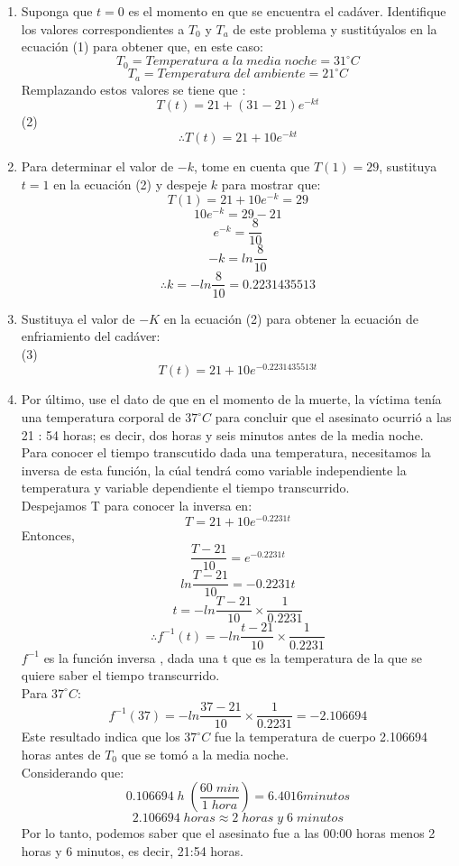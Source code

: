 \documentclass[12pt]{article}
\begin{document}
\begin{enumerate}
\item Suponga que $t = 0$ es el momento en que se encuentra el cadáver. Identifique los valores
correspondientes a $T_0$ y $T_a$ de este problema y sustitúyalos en la ecuación (1) para obtener
que, en este caso:
\[
T_0 = Temperatura \;a \;la\; media \;noche= 31  ^{\circ} C
\]
\[
T_a = Temperatura \;del \;ambiente = 21 ^{\circ}  C
\]
Remplazando estos valores se tiene que : 
\[
T(t)= 21 + (31-21)e^{-kt}
\]
(2)
\[
\therefore  T(t)= 21 + 10e^{-kt}
\]  
\item Para determinar el valor de $-k$, tome en cuenta que $T(1) = 29$, sustituya $t = 1$ en la ecuación (2) y despeje $k$ para mostrar que:
\[
 T(1)= 21 + 10e^{-k} = 29
\]  
\[
 10e^{-k} = 29-21
\]  
\[
  e^{-k} = \frac{8}{10}
\]  
\[
 -k = ln\frac{8}{10}
\]  
\[
 \therefore  k = -ln\frac{8}{10} = 0.2231435513
\] 
\item Sustituya el valor de $-K$ en la ecuación (2) para obtener la ecuación de enfriamiento del
cadáver:\\
(3)
\[
T(t)= 21 + 10e^{-0.2231435513t}
\] 
\item Por último, use el dato de que en el momento de la muerte, la víctima tenía una temperatura
corporal de $37  ^{\circ} C$ para concluir que el asesinato ocurrió a las 21 : 54 horas; es decir, dos horas y seis minutos antes de la media noche.
\\
Para conocer el tiempo transcutido dada una temperatura, necesitamos la inversa de esta función, la cúal tendrá como variable independiente la temperatura y variable dependiente el tiempo transcurrido. \\
Despejamos T para conocer la inversa en: 
\[
T= 21 + 10e^{-0.2231t}
\] 
Entonces, 
\[
\frac{T-21}{10}= e^{-0.2231t}
\] 
\[
ln \frac{T-21}{10}= -0.2231t
\] 
\[
t = -ln \frac{T-21}{10} \times \frac{1}{0.2231}
\]
\[
\therefore f^{-1}(t) = -ln \frac{t-21}{10} \times \frac{1}{0.2231}
\]
$f^{-1}$ es la función inversa , dada una t que es la temperatura de la que se quiere saber el tiempo transcurrido.\\
Para  $37  ^{\circ} C$:
\[
f^{-1}(37) = -ln \frac{37-21}{10} \times \frac{1}{0.2231} = -2.106694
\]
Este resultado indica que los $37  ^{\circ} C$ fue la temperatura de cuerpo 2.106694 horas antes de $T_0$ que se tomó a la media noche.\\
Considerando que:
\[
	0.106694\;h \;(\frac{60 \; min}{1\; hora}) = 6.4016 minutos
\]
\[
2.106694 \; horas \approx 2 \;horas \;y \;6 \;minutos
\]
Por lo tanto, podemos saber que el asesinato fue a las 00:00 horas menos 2 horas y 6 minutos, es decir, 21:54 horas.
\end{enumerate}
\end{document}
